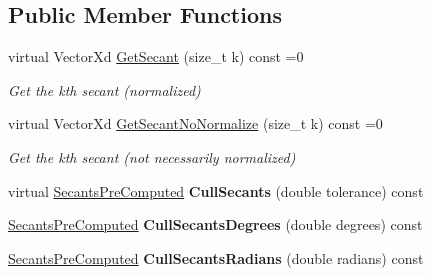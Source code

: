\subsection*{Public Member Functions}
\begin{DoxyCompactItemize}
\item 
\hypertarget{struct_d_r_d_s_p_1_1_secants_aa36f3ff75b75d498e585cbac447cede9}{virtual Vector\-Xd \hyperlink{struct_d_r_d_s_p_1_1_secants_aa36f3ff75b75d498e585cbac447cede9}{Get\-Secant} (size\-\_\-t k) const =0}\label{struct_d_r_d_s_p_1_1_secants_aa36f3ff75b75d498e585cbac447cede9}

\begin{DoxyCompactList}\small\item\em Get the kth secant (normalized) \end{DoxyCompactList}\item 
\hypertarget{struct_d_r_d_s_p_1_1_secants_a96e9a725643c31456df79a797f427981}{virtual Vector\-Xd \hyperlink{struct_d_r_d_s_p_1_1_secants_a96e9a725643c31456df79a797f427981}{Get\-Secant\-No\-Normalize} (size\-\_\-t k) const =0}\label{struct_d_r_d_s_p_1_1_secants_a96e9a725643c31456df79a797f427981}

\begin{DoxyCompactList}\small\item\em Get the kth secant (not necessarily normalized) \end{DoxyCompactList}\item 
\hypertarget{struct_d_r_d_s_p_1_1_secants_a9b6763bc1541a775e842e437448200ef}{virtual \hyperlink{struct_d_r_d_s_p_1_1_secants_pre_computed}{Secants\-Pre\-Computed} {\bfseries Cull\-Secants} (double tolerance) const }\label{struct_d_r_d_s_p_1_1_secants_a9b6763bc1541a775e842e437448200ef}

\item 
\hypertarget{struct_d_r_d_s_p_1_1_secants_abc02bf01e73c2d89848a090c88666291}{\hyperlink{struct_d_r_d_s_p_1_1_secants_pre_computed}{Secants\-Pre\-Computed} {\bfseries Cull\-Secants\-Degrees} (double degrees) const }\label{struct_d_r_d_s_p_1_1_secants_abc02bf01e73c2d89848a090c88666291}

\item 
\hypertarget{struct_d_r_d_s_p_1_1_secants_aec22fc746a9047366d7b81729a2e4f8a}{\hyperlink{struct_d_r_d_s_p_1_1_secants_pre_computed}{Secants\-Pre\-Computed} {\bfseries Cull\-Secants\-Radians} (double radians) const }\label{struct_d_r_d_s_p_1_1_secants_aec22fc746a9047366d7b81729a2e4f8a}

\end{DoxyCompactItemize}
